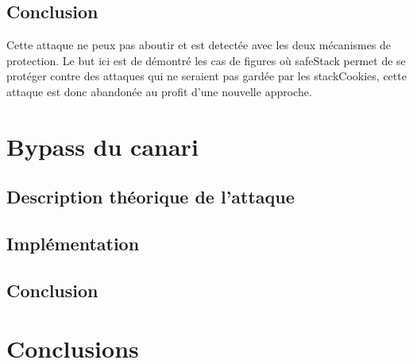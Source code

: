 \subsection{Conclusion}

Cette attaque ne peux pas aboutir et est detectée avec les deux mécanismes de protection. Le but ici est de démontré les cas de figures où \gls{safeStack} permet de se protéger contre des attaques qui ne seraient pas gardée par les \gls{stackCookies}, cette attaque est donc abandonée au profit d'une nouvelle approche.


\section{Bypass du canari}

\subsection{Description théorique de l'attaque}
\subsection{Implémentation}
\subsection{Conclusion}


\section{Conclusions}
